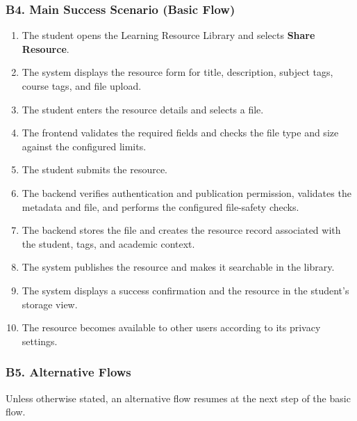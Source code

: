 \documentclass[12pt]{article}
\begin{document}
\hypertarget{sec:b4-main-success-scenario-basic-flow}{}
\subsubsection*{B4. Main Success Scenario (Basic Flow)}
\par\medskip

\begin{enumerate}
\item The student opens the Learning Resource Library and selects \textbf{Share Resource}.
\item The system displays the resource form for title, description, subject tags, course tags, and file upload.
\item The student enters the resource details and selects a file.
\item The frontend validates the required fields and checks the file type and size against the configured limits.
\item The student submits the resource.
\item The backend verifies authentication and publication permission, validates the metadata and file, and performs the configured file-safety checks.
\item The backend stores the file and creates the resource record associated with the student, tags, and academic context.
\item The system publishes the resource and makes it searchable in the library.
\item The system displays a success confirmation and the resource in the student's storage view.
\item The resource becomes available to other users according to its privacy settings.
\end{enumerate}
\par\medskip

\hypertarget{sec:b5-alternative-flows}{}
\subsubsection*{B5. Alternative Flows}
\par\medskip

Unless otherwise stated, an alternative flow resumes at the next step of the basic flow.
\par\medskip

\hypertarget{sec:a1-add-or-change-tags}{}
\end{document}

